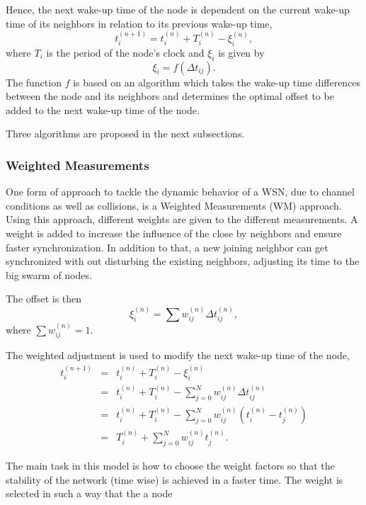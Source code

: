 \documentclass[journal]{IEEEtran}
\begin{document}
Hence, the next wake-up time of the node is
dependent on the current wake-up time of its neighbors in relation
to its previous wake-up time,
\begin{equation}
t_i^{(n+1)} = t_i^{(n)} + T_i^{(n)} - \xi_i^{(n)} ,
\end{equation}
where $T_i$ is the period of the node's clock and $\xi_i$ is given
by
\begin{equation}
\xi_i = f(\Delta t_{ij}).
\end{equation}
The function $f$ is based on an algorithm which takes the wake-up
time differences between the node and its neighbors and determines
the optimal offset to be added to the next wake-up time of the node.
\par Three algorithms are proposed in the next subsections.
\subsubsection{\textbf{Weighted Measurements}}
One form of approach to tackle the dynamic behavior of a WSN, due to channel conditions as well as collisions, is a
Weighted Measurements (WM) approach. Using this approach, different
weights are given to the different measurements. A weight is added to
increase the influence of the close by neighbors and ensure
faster synchronization. In addition to that, a new joining neighbor
can get synchronized with out disturbing the existing neighbors,
adjusting its time to the big swarm of nodes.\par
The offset is then
\begin{equation}
\xi_i^{(n)} = \sum{w_{ij}^{(n)}\Delta t_{ij}^{(n)}} ,
\end{equation}
where $\sum{w_{ij}^{(n)}= 1}$.
\par
The weighted adjustment is used to modify the next wake-up time of
the node,
\begin{eqnarray*}
t_i^{(n+1)} &=& t_i^{(n)} + T_i^{(n)} - \xi_i^{(n)} \\ &=& t_i^{(n)}
+ T_i^{(n)} - \sum_{j=0}^N{w_{ij}^{(n)}\Delta t_{ij}^{(n)}} \\ &=&
t_i^{(n)}+ T_i^{(n)} -
\sum_{j=0}^N{w_{ij}^{(n)}(t_i^{(n)}-t_j^{(n)})} \\ &=& T_i^{(n)} + \sum_{j=0}^N{w_{ij}^{(n)}t_j^{(n)}}.
\end{eqnarray*}
\par
The main task in this model is how to choose the weight factors
so that the stability of the network (time wise) is achieved in a
faster time. The weight is selected in such a way that the a node
\end{document}
